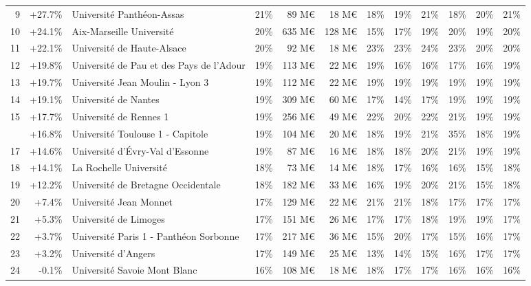 \documentclass[11pt,french,landscape]{article}
\begin{document}
\begin{longtable}{rrlrrrrrrlrr}
\rowcolor{gray!6}  9 & +27.7\% & Université Panthéon-Assas & 21\% & 89 M€ & 18 M€ & 18\% & 19\% & 21\% & 18\% & 20\% & 21\%\\
10 & +24.1\% & Aix-Marseille Université & 20\% & 635 M€ & 128 M€ & 15\% & 17\% & 19\% & 20\% & 19\% & 20\%\\
\addlinespace
\rowcolor{gray!6}  11 & +22.1\% & Université de Haute-Alsace & 20\% & 92 M€ & 18 M€ & 23\% & 23\% & 24\% & 23\% & 20\% & 20\%\\
12 & +19.8\% & Université de Pau et des Pays de l'Adour & 19\% & 113 M€ & 22 M€ & 19\% & 16\% & 16\% & 17\% & 16\% & 19\%\\
\rowcolor{gray!6}  13 & +19.7\% & Université Jean Moulin - Lyon 3 & 19\% & 112 M€ & 22 M€ & 19\% & 19\% & 19\% & 19\% & 19\% & 19\%\\
14 & +19.1\% & Université de Nantes & 19\% & 309 M€ & 60 M€ & 17\% & 14\% & 17\% & 19\% & 19\% & 19\%\\
\rowcolor{gray!6}  15 & +17.7\% & Université de Rennes 1 & 19\% & 256 M€ & 49 M€ & 22\% & 20\% & 22\% & 21\% & 19\% & 19\%\\
\addlinespace
16 & +16.8\% & Université Toulouse 1 - Capitole & 19\% & 104 M€ & 20 M€ & 18\% & 19\% & 21\% & 35\% & 18\% & 19\%\\
\rowcolor{gray!6}  17 & +14.6\% & Université d'Évry-Val d'Essonne & 19\% & 87 M€ & 16 M€ & 18\% & 18\% & 20\% & 21\% & 19\% & 19\%\\
18 & +14.1\% & La Rochelle Université & 18\% & 73 M€ & 14 M€ & 18\% & 17\% & 16\% & 16\% & 15\% & 18\%\\
\rowcolor{gray!6}  19 & +12.2\% & Université de Bretagne Occidentale & 18\% & 182 M€ & 33 M€ & 16\% & 19\% & 20\% & 21\% & 15\% & 18\%\\
20 & +7.4\% & Université Jean Monnet & 17\% & 129 M€ & 22 M€ & 21\% & 21\% & 18\% & 17\% & 17\% & 17\%\\
\addlinespace
\rowcolor{gray!6}  21 & +5.3\% & Université de Limoges & 17\% & 151 M€ & 26 M€ & 17\% & 17\% & 18\% & 19\% & 19\% & 17\%\\
22 & +3.7\% & Université Paris 1 - Panthéon Sorbonne & 17\% & 217 M€ & 36 M€ & 15\% & 20\% & 17\% & 15\% & 16\% & 17\%\\
\rowcolor{gray!6}  23 & +3.2\% & Université d'Angers & 17\% & 149 M€ & 25 M€ & 13\% & 14\% & 15\% & 16\% & 17\% & 17\%\\
24 & -0.1\% & Université Savoie Mont Blanc & 16\% & 108 M€ & 18 M€ & 18\% & 17\% & 17\% & 16\% & 16\% & 16\%\\

\end{longtable}
\end{document}
